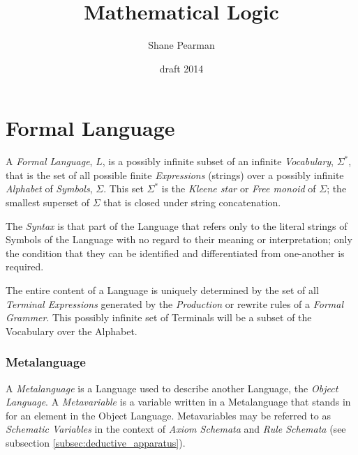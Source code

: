 \documentclass{article}
\begin{document}
\setcounter{secnumdepth}{5}
\setcounter{tocdepth}{5}


\title{Mathematical Logic}
\date{draft 2014}
\author{Shane Pearman}
\maketitle


\tableofcontents

\part{Formal Language}

A \emph{Formal Language}, $L$, is a possibly infinite subset of an
infinite \emph{Vocabulary}, $\Sigma^*$, that is the set of all
possible finite \emph{Expressions} (strings) over a possibly infinite
\emph{Alphabet} of \emph{Symbols}, $\Sigma$. This set $\Sigma^*$ is
the \emph{Kleene star} or \emph{Free monoid} of $\Sigma$; the smallest
superset of $\Sigma$ that is closed under string concatenation.

The \emph{Syntax} is that part of the Language that refers only to the
literal strings of Symbols of the Language with no regard to their
meaning or interpretation; only the condition that they can be
identified and differentiated from one-another is required.

The entire content of a Language is uniquely determined by the set of
all \emph{Terminal Expressions} generated by the \emph{Production} or
rewrite rules of a \emph{Formal Grammer}. This possibly infinite set
of Terminals will be a subset of the Vocabulary over the Alphabet.


\section{Metalanguage}\label{sec:metalanguage}

A \emph{Metalanguage} is a Language used to describe another Language,
the \emph{Object Language}. A \emph{Metavariable} is a variable
written in a Metalanguage that stands in for an element in the Object
Language. Metavariables may be referred to as \emph{Schematic
  Variables} in the context of \emph{Axiom Schemata} and \emph{Rule
  Schemata} (see subsection \ref{subsec:deductive_apparatus}).
\end{document}
